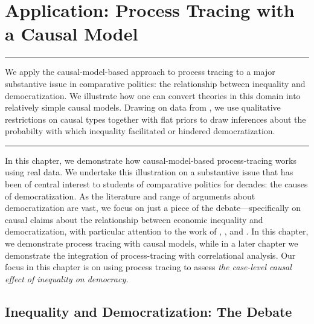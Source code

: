 \documentclass[12pt,]{book}
\begin{document}
\hypertarget{application-process-tracing-with-a-causal-model}{%
\chapter{Application: Process Tracing with a Causal Model}\label{application-process-tracing-with-a-causal-model}}

\begin{center}\rule{0.5\linewidth}{\linethickness}\end{center}

We apply the causal-model-based approach to process tracing to a major substantive issue in comparative politics: the relationship between inequality and democratization. We illustrate how one can convert theories in this domain into relatively simple causal models. Drawing on data from \citet{haggard2012inequality}, we use qualitative restrictions on causal types together with flat priors to draw inferences about the probabilty with which inequality facilitated or hindered democratization.

\begin{center}\rule{0.5\linewidth}{\linethickness}\end{center}

In this chapter, we demonstrate how causal-model-based process-tracing works using real data. We undertake this illustration on a substantive issue that has been of central interest to students of comparative politics for decades: the causes of democratization. As the literature and range of arguments about democratization are vast, we focus on just a piece of the debate---specifically on causal claims about the relationship between economic inequality and democratization, with particular attention to the work of \citet{boix2003democracy}, \citet{acemoglu2005economic}, and \citet{haggard2012inequality}. In this chapter, we demonstrate process tracing with causal models, while in a later chapter we demonstrate the integration of process-tracing with correlational analysis. Our focus in this chapter is on using process tracing to assess \emph{the case-level causal effect of inequality on democracy.}

\hypertarget{inequality-and-democratization-the-debate}{%
\section{Inequality and Democratization: The Debate}\label{inequality-and-democratization-the-debate}}
\end{document}
